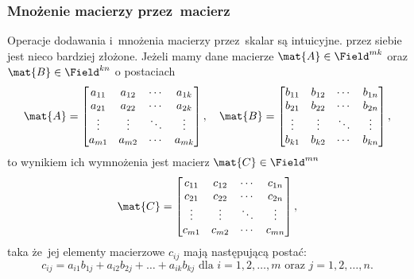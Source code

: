 \subsubsection{Mnożenie macierzy przez~macierz}
Operacje dodawania i~mnożenia macierzy przez~skalar są intuicyjne.
 przez siebie
jest nieco bardziej złożone. Jeżeli mamy dane macierze $\mat{A}\in\Field^{mk}$ oraz
$\mat{B}\in\Field^{kn}$ o postaciach
$$
	\mat{A} =
	\begin{bmatrix}
		a_{11} & a_{12} & \cdots & a_{1k} \\
		a_{21} & a_{22} & \cdots & a_{2k} \\
		\vdots & \vdots & \ddots & \vdots \\
		a_{m1} & a_{m2} & \cdots & a_{mk}
	\end{bmatrix}, \quad
	\mat{B} =
	\begin{bmatrix}
		b_{11} & b_{12} & \cdots & b_{1n} \\
		b_{21} & b_{22} & \cdots & b_{2n} \\
		\vdots & \vdots & \ddots & \vdots \\
		b_{k1} & b_{k2} & \cdots & b_{kn}
	\end{bmatrix},
$$
to wynikiem ich wymnożenia jest macierz $\mat{C}\in\Field^{mn}$
$$
	\mat{C} =
	\begin{bmatrix}
		c_{11} & c_{12} & \cdots & c_{1n} \\
		c_{21} & c_{22} & \cdots & c_{2n} \\
		\vdots & \vdots & \ddots & \vdots \\
		c_{m1} & c_{m2} & \cdots & c_{mn}
	\end{bmatrix},
$$
taka że~jej elementy macierzowe $c_{ij}$ mają następującą postać:
$$c_{ij}=a_{i1}b_{1j} + a_{i2}b_{2j} + \dots + a_{ik}b_{kj} \text{ dla } i=1,2,\dots, m \text{ oraz } j=1,2,\dots, n.$$

